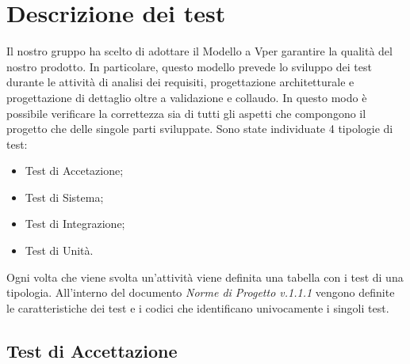 \section{Descrizione dei test}
Il nostro gruppo ha scelto di adottare il Modello a V\glosp per garantire la qualità del nostro prodotto. In particolare, questo modello prevede lo sviluppo dei test durante le attività di analisi dei requisiti, progettazione architetturale e progettazione di dettaglio oltre a validazione e collaudo.
In questo modo è possibile verificare la correttezza sia di tutti gli aspetti che compongono il progetto che delle singole parti sviluppate. Sono state individuate 4 tipologie di test:
\begin{itemize}
	\item Test di Accetazione;
	\item Test di Sistema;
	\item Test di Integrazione;
	\item Test di Unità.
\end{itemize}
Ogni volta che viene svolta un'attività viene definita una tabella con i test di una tipologia.
All'interno del documento \textit{Norme di Progetto v.1.1.1} vengono definite le caratteristiche dei test e i codici che identificano univocamente i singoli test.

\subsection{Test di Accettazione}

